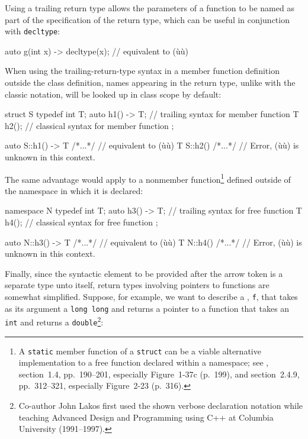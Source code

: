 \noindent Using a trailing return type allows the parameters of a function to be
named as part of the specification of the return type, which can be
useful in conjunction with \lstinline!decltype!:

\begin{emcppslisting}
auto g(int x) -> decltype(x);  // equivalent to (ù{}ù)
\end{emcppslisting}

\noindent When using the trailing-return-type syntax in a member function
definition outside the class definition, names appearing in the return
type, unlike with the classic notation, will be looked up in class scope
by default:

\begin{emcppslisting}
struct S
{
    typedef int T;
    auto h1() -> T;  // trailing syntax for member function
    T h2();          // classical syntax for member function
};

auto S::h1() -> T { /*...*/ }  // equivalent to (ù{}ù)
T    S::h2()      { /*...*/ }  // Error, (ù{}ù) is unknown in this context.
\end{emcppslisting}

\noindent The same advantage would apply to a nonmember
function{\cprotect\footnote{A \lstinline!static! member function of a
\lstinline!struct! can be a viable alternative implementation to a free
function declared within a namespace; see \cite{lakos20}, section~1.4,
pp.~190--201, especially Figure~1-37c (p.~199), and section~2.4.9, pp.~312--321, especially Figure~2-23 (p.~316).}} defined outside of the namespace in
which it is declared:

\begin{emcppslisting}
namespace N
{
    typedef int T;
    auto h3() -> T;  // trailing syntax for free function
    T h4();          // classical syntax for free function
};

auto N::h3() -> T { /*...*/ }  // equivalent to (ù{}ù)
T    N::h4()      { /*...*/ }  // Error, (ù{}ù) is unknown in this context.
\end{emcppslisting}


Finally, since the syntactic element to be provided after the arrow
token is a separate type unto itself, return types involving pointers to
functions are somewhat simplified. Suppose, for example, we want to
describe a , \lstinline!f!, that takes as its
argument a \lstinline!long!~\lstinline!long! and returns a pointer to a
function that takes an \lstinline!int! and returns a
\lstinline!double!{\cprotect\footnote{Co-author John Lakos first used the shown verbose declaration notation
while teaching Advanced Design and Programming using C++ at Columbia
  University (1991--1997).}}:

